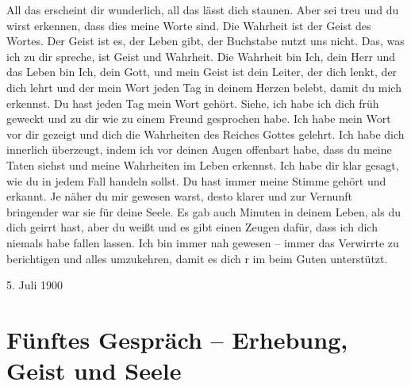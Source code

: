  All das erscheint dir wunderlich, all das lässt dich staunen. Aber sei treu und du wirst erkennen, dass dies meine Worte sind. Die Wahrheit ist der Geist des Wortes. Der Geist ist es, der Leben gibt, der Buchstabe nutzt uns nicht. Das, was ich zu dir spreche, ist Geist und Wahrheit. Die Wahrheit bin Ich, dein Herr und das Leben bin Ich, dein Gott, und mein Geist ist dein Leiter, der dich lenkt, der dich lehrt und der mein Wort jeden Tag in deinem Herzen belebt, damit du mich erkennst. Du hast jeden Tag mein Wort gehört. Siehe, ich habe ich dich früh geweckt und zu dir wie zu einem Freund gesprochen habe. Ich habe mein Wort vor dir gezeigt und dich die Wahrheiten des Reiches Gottes gelehrt. Ich habe dich innerlich überzeugt, indem ich vor deinen Augen offenbart habe, dass du meine Taten siehst und meine Wahrheiten im Leben erkennst. Ich habe dir klar gesagt, wie du in jedem Fall handeln sollst. Du hast immer meine Stimme gehört und erkannt. Je näher du mir gewesen warst, desto klarer und zur Vernunft bringender war sie für deine Seele. Es gab auch Minuten in deinem Leben, als du dich geirrt hast, aber du weißt und es gibt einen Zeugen dafür, dass ich dich niemals habe fallen lassen. Ich bin immer nah gewesen -- immer das Verwirrte zu berichtigen und alles umzukehren, damit es dich r im beim Guten unterstützt.
 
 5. Juli 1900






\section{Fünftes Gespräch -- Erhebung, Geist und Seele}

